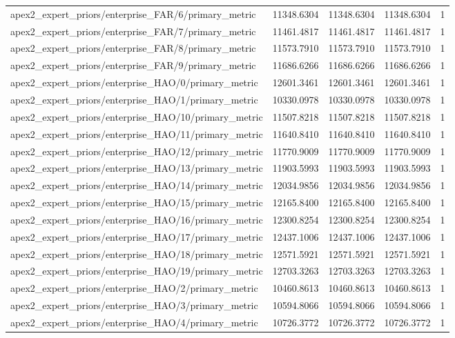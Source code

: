 \begin{table}[h]
\begin{tabular}{lrrrr}
apex2_expert_priors/enterprise_FAR/6/primary_metric & 11348.6304 & 11348.6304 & 11348.6304 & 1 \\
apex2_expert_priors/enterprise_FAR/7/primary_metric & 11461.4817 & 11461.4817 & 11461.4817 & 1 \\
apex2_expert_priors/enterprise_FAR/8/primary_metric & 11573.7910 & 11573.7910 & 11573.7910 & 1 \\
apex2_expert_priors/enterprise_FAR/9/primary_metric & 11686.6266 & 11686.6266 & 11686.6266 & 1 \\
apex2_expert_priors/enterprise_HAO/0/primary_metric & 12601.3461 & 12601.3461 & 12601.3461 & 1 \\
apex2_expert_priors/enterprise_HAO/1/primary_metric & 10330.0978 & 10330.0978 & 10330.0978 & 1 \\
apex2_expert_priors/enterprise_HAO/10/primary_metric & 11507.8218 & 11507.8218 & 11507.8218 & 1 \\
apex2_expert_priors/enterprise_HAO/11/primary_metric & 11640.8410 & 11640.8410 & 11640.8410 & 1 \\
apex2_expert_priors/enterprise_HAO/12/primary_metric & 11770.9009 & 11770.9009 & 11770.9009 & 1 \\
apex2_expert_priors/enterprise_HAO/13/primary_metric & 11903.5993 & 11903.5993 & 11903.5993 & 1 \\
apex2_expert_priors/enterprise_HAO/14/primary_metric & 12034.9856 & 12034.9856 & 12034.9856 & 1 \\
apex2_expert_priors/enterprise_HAO/15/primary_metric & 12165.8400 & 12165.8400 & 12165.8400 & 1 \\
apex2_expert_priors/enterprise_HAO/16/primary_metric & 12300.8254 & 12300.8254 & 12300.8254 & 1 \\
apex2_expert_priors/enterprise_HAO/17/primary_metric & 12437.1006 & 12437.1006 & 12437.1006 & 1 \\
apex2_expert_priors/enterprise_HAO/18/primary_metric & 12571.5921 & 12571.5921 & 12571.5921 & 1 \\
apex2_expert_priors/enterprise_HAO/19/primary_metric & 12703.3263 & 12703.3263 & 12703.3263 & 1 \\
apex2_expert_priors/enterprise_HAO/2/primary_metric & 10460.8613 & 10460.8613 & 10460.8613 & 1 \\
apex2_expert_priors/enterprise_HAO/3/primary_metric & 10594.8066 & 10594.8066 & 10594.8066 & 1 \\
apex2_expert_priors/enterprise_HAO/4/primary_metric & 10726.3772 & 10726.3772 & 10726.3772 & 1 \\

\end{tabular}
\end{table}
